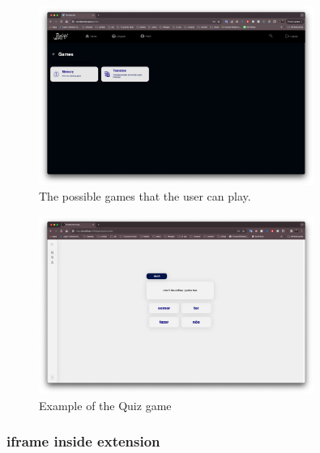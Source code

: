 \documentclass[12pt]{article}
\begin{document}
    \begin{figure}[!h]
      \centering
      \caption{
      The possible games that the user can play.
      }
      \label{fig:site5}
      \includegraphics[width=0.8\textwidth]{assets/5.png}
    \end{figure}





    \begin{figure}[!h]
      \centering
      \caption{
      Example of the Quiz game 
      }
      \label{fig:site8}
      \includegraphics[width=0.8\textwidth]{assets/8.png}
    \end{figure}
\subsubsection{iframe inside extension}
\end{document}
